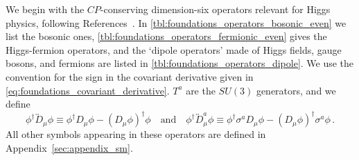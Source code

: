 We begin with the $CP$-conserving dimension-six operators relevant for
Higgs physics, following References~\cite{Corbett:2012ja, Juan_thesis,
  Tyler_thesis}.  In \autoref{tbl:foundations_operators_bosonic_even}
we list the bosonic ones,
\autoref{tbl:foundations_operators_fermionic_even} gives the
Higgs-fermion operators, and the `dipole operators' made of Higgs
fields, gauge bosons, and fermions are listed in
\autoref{tbl:foundations_operators_dipole}. We use the convention for
the sign in the covariant derivative given in
\autoref{eq:foundations_covariant_derivative}. $T^a$ are the $SU(3)$
generators, and we define
%
\begin{equation}
  \phi^\dagger \overleftrightarrow{D}_\mu \phi \equiv \phi^\dagger D_\mu \phi - (D_\mu \phi)^\dagger \phi
 \quad \text{and} \quad 
  \phi^\dagger \overleftrightarrow{D}_\mu^a \phi \equiv \phi^\dagger \sigma^a D_\mu \phi - (D_\mu \phi)^\dagger \sigma^a \phi \,.
\end{equation}
%
All other symbols appearing in these operators are defined in
Appendix~\ref{sec:appendix_sm}.


